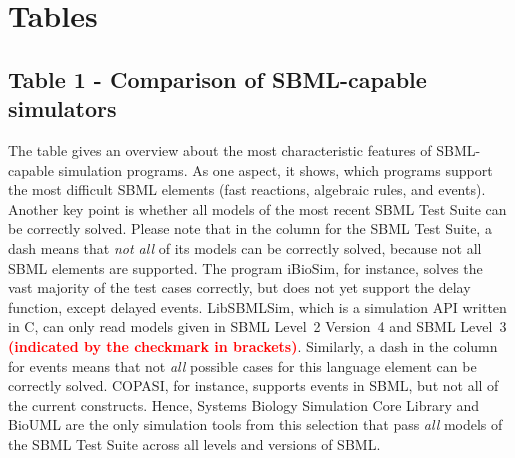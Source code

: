 \documentclass[10pt]{bmc_article}
\newenvironment{bmcformat}{\baselineskip20pt\sloppy\setboolean{publ}{false}}{\baselineskip20pt\sloppy}
\newcommand{\TODO}[1]{\textcolor{red}{\textbf{#1}}}
\begin{document}
\begin{bmcformat}
\section*{Tables}

\subsection*{Table 1 - Comparison of SBML-capable simulators}
The table gives an overview about the most characteristic features of
SBML-capable simulation programs. As one aspect, it shows, which programs
support the most difficult SBML elements (fast reactions, algebraic rules, and
events). Another key point is whether all models of the most recent SBML Test
Suite can be correctly solved.
Please note that in the column for the SBML Test Suite, a dash means that
\emph{not all} of its models can be correctly solved, because not all SBML
elements are supported.
The program iBioSim, for instance, solves the vast majority of the test cases
correctly, but does not yet support the delay function, except delayed events.
LibSBMLSim, which is a simulation API written in C, can only read models given
in SBML Level~2 Version~4 and SBML Level~3
\TODO{(indicated by the checkmark in brackets)}.
Similarly, a dash in the column for events means that not \emph{all} possible
cases for this language element can be correctly solved.
COPASI, for instance, supports events in SBML, but not all of the current 
constructs.
Hence, Systems Biology Simulation Core Library and BioUML are the only
simulation tools from this selection that pass \emph{all} models of the SBML
Test Suite across all levels and versions of SBML.


\end{bmcformat}
\end{document}
